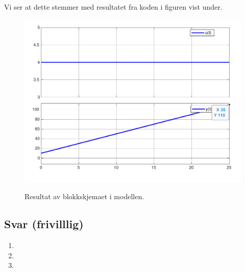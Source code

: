 \documentclass[answers,11pt]{exam}
\begin{document}
\begin{enumerate}[label=\alph*)]
\begin{tcolorbox}
\begin{enumerate}[label=a\arabic*)]
            Vi ser at dette stemmer med resultatet fra koden i figuren vist
            under.
            \begin{figure}[H]
              \centering
              \hspace*{0mm}\scalebox{0.65}
              {\includegraphics{figurer/a4.pdf}}
              \caption{Resultat av blokkskjemaet i modellen.
                \label{fig:2a2}}
            \end{figure}
    \end{enumerate}

  \end{tcolorbox}

  \newpage
  

  \begin{tcolorbox}
    \subsection*{Svar (frivilllig)}

    \begin{enumerate}[label=b\arabic*)]
      \item

      \item

      \item

    \end{enumerate}


\end{tcolorbox}
\end{enumerate}
\end{document}

